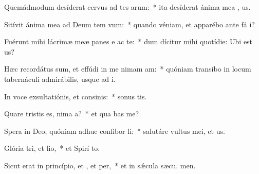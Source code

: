 \item Quemádmodum desíderat cervus ad tes arum:~* ita desíderat ánima mea  , us.
\item Sitívit ánima mea ad Deum tem vum:~* quando véniam, et apparébo ante fá i?
\item Fuérunt mihi lácrimæ meæ panes e ac te:~* dum dícitur mihi quotídie: Ubi est  us?
\item Hæc recordátus sum, et effúdi in me nimam am:~* quóniam transíbo in locum tabernáculi admirábilis, usque ad  i.
\item In voce exsultatiónis, et consinis:~* sonus tis.
\item Quare tristis es, nima a?~* et qua bas me?
\item Spera in Deo, quóniam adhuc confibor li:~* salutáre vultus mei, et  us.
\item Glória tri, et lio,~* et Spirí to.
\item Sicut erat in princípio, et , et per,~* et in sǽcula sæcu. men.
